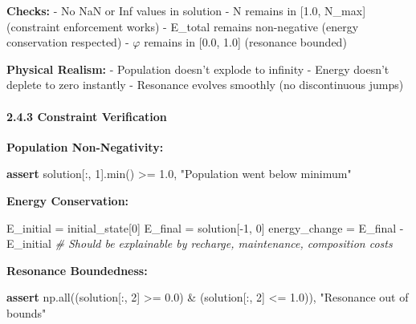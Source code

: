 \documentclass[
]{article}
\newenvironment{Shaded}{}{}
\newcommand{\BuiltInTok}[1]{\textcolor[rgb]{0.00,0.50,0.00}{#1}}
\newcommand{\CommentTok}[1]{\textcolor[rgb]{0.38,0.63,0.69}{\textit{#1}}}
\newcommand{\ControlFlowTok}[1]{\textcolor[rgb]{0.00,0.44,0.13}{\textbf{#1}}}
\newcommand{\DecValTok}[1]{\textcolor[rgb]{0.25,0.63,0.44}{#1}}
\newcommand{\FloatTok}[1]{\textcolor[rgb]{0.25,0.63,0.44}{#1}}
\newcommand{\NormalTok}[1]{#1}
\newcommand{\OperatorTok}[1]{\textcolor[rgb]{0.40,0.40,0.40}{#1}}
\newcommand{\StringTok}[1]{\textcolor[rgb]{0.25,0.44,0.63}{#1}}
\begin{document}
\textbf{Checks:} - No NaN or Inf values in solution - N remains in
{[}1.0, N\_max{]} (constraint enforcement works) - E\_total remains
non-negative (energy conservation respected) - $\varphi$ remains in {[}0.0,
1.0{]} (resonance bounded)

\textbf{Physical Realism:} - Population doesn't explode to infinity -
Energy doesn't deplete to zero instantly - Resonance evolves smoothly
(no discontinuous jumps)

\paragraph{2.4.3 Constraint Verification}\label{constraint-verification}

\textbf{Population Non-Negativity:}

\begin{Shaded}
\begin{Highlighting}[]
\ControlFlowTok{assert}\NormalTok{ solution[:, }\DecValTok{1}\NormalTok{].}\BuiltInTok{min}\NormalTok{() }\OperatorTok{\textgreater{}=} \FloatTok{1.0}\NormalTok{, }\StringTok{"Population went below minimum"}
\end{Highlighting}
\end{Shaded}

\textbf{Energy Conservation:}

\begin{Shaded}
\begin{Highlighting}[]
\NormalTok{E\_initial }\OperatorTok{=}\NormalTok{ initial\_state[}\DecValTok{0}\NormalTok{]}
\NormalTok{E\_final }\OperatorTok{=}\NormalTok{ solution[}\OperatorTok{{-}}\DecValTok{1}\NormalTok{, }\DecValTok{0}\NormalTok{]}
\NormalTok{energy\_change }\OperatorTok{=}\NormalTok{ E\_final }\OperatorTok{{-}}\NormalTok{ E\_initial}
\CommentTok{\# Should be explainable by recharge, maintenance, composition costs}
\end{Highlighting}
\end{Shaded}

\textbf{Resonance Boundedness:}

\begin{Shaded}
\begin{Highlighting}[]
\ControlFlowTok{assert}\NormalTok{ np.}\BuiltInTok{all}\NormalTok{((solution[:, }\DecValTok{2}\NormalTok{] }\OperatorTok{\textgreater{}=} \FloatTok{0.0}\NormalTok{) }\OperatorTok{\&}\NormalTok{ (solution[:, }\DecValTok{2}\NormalTok{] }\OperatorTok{\textless{}=} \FloatTok{1.0}\NormalTok{)), }\StringTok{"Resonance out of bounds"}
\end{Highlighting}
\end{Shaded}
\end{document}
